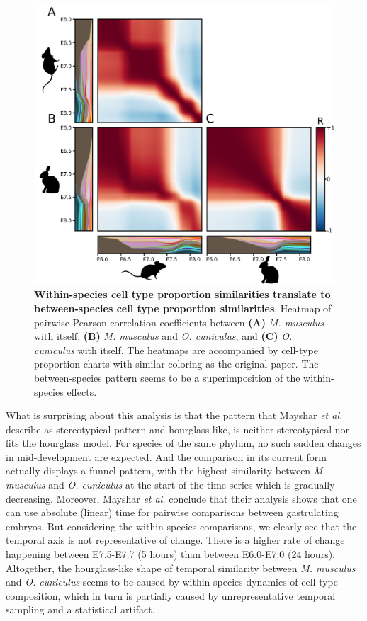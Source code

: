 \begin{figure}[H]
    \center
    \includegraphics[width=0.8\linewidth]{ch.hourglass/images/mouse_rabbit_cellproportions.png}
    \caption{\textbf{Within-species cell type proportion similarities translate to between-species cell type proportion similarities}. Heatmap of pairwise Pearson correlation coefficients between \textbf{(A)} \textit{M. musculus} with itself, \textbf{(B)} \textit{M. musculus} and \textit{O. cuniculus}, and \textbf{(C)} \textit{O. cuniculus} with itself. The heatmaps are accompanied by cell-type proportion charts with similar coloring as the original paper. The between-species pattern seems to be a superimposition of the within-species effects.}
    \label{fig:cellproportions}
\end{figure}

What is surprising about this analysis is that the pattern that Mayshar \textit{et al.} describe as stereotypical pattern and hourglass-like, is neither stereotypical nor fits the hourglass model. For species of the same phylum, no such sudden changes in mid-development are expected. And the comparison in its current form actually displays a funnel pattern, with the highest similarity between \textit{M. musculus} and \textit{O. cuniculus} at the start of the time series which is gradually decreasing. Moreover, Mayshar \textit{et al.} conclude that their analysis shows that one can use absolute (linear) time for pairwise comparisons between gastrulating embryos. But considering the within-species comparisons, we clearly see that the temporal axis is not representative of change. There is a higher rate of change happening between E7.5-E7.7 (5 hours) than between E6.0-E7.0 (24 hours). Altogether, the hourglass-like shape of temporal similarity between  \textit{M. musculus} and \textit{O. cuniculus} seems to be caused by within-species dynamics of cell type composition, which in turn is partially caused by unrepresentative temporal sampling and a statistical artifact.

